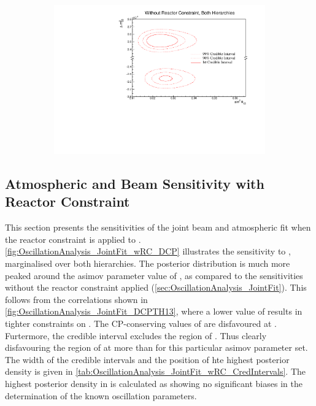 \begin{figure}[h]
  \begin{subfigure}[t]{1.0\textwidth}
    \includegraphics[width=\textwidth, trim={0mm 0mm 0mm 0mm}, clip,page=1]{Figures/OA/JointFit/Contours_2D_th13_dm32_BH_0_woRC_UnSmeared_CredibleInterval.pdf}
  \end{subfigure}
  \caption{}
  \label{fig:OscillationAnalysis_JointFit_DM32TH13}
\end{figure}

\subsection{Atmospheric and Beam Sensitivity with Reactor Constraint}
\label{sec:OscillationAnalysis_JointFit_wRC}

This section presents the sensitivities of the joint beam and atmospheric fit when the reactor constraint is applied to \sinsqreac. \autoref{fig:OscillationAnalysis_JointFit_wRC_DCP} illustrates the sensitivity to , marginalised over both hierarchies. The posterior distribution is much more peaked around the asimov parameter value of , as compared to the sensitivities without the reactor constraint applied (\autoref{sec:OscillationAnalysis_JointFit}). This follows from the correlations shown in \autoref{fig:OscillationAnalysis_JointFit_DCPTH13}, where a lower value of \sinsqreac results in tighter constraints on . The CP-conserving values of  are disfavoured at \quickmath{2\sigma}. Furtermore, the \quickmath{3\sigma} credible interval excludes the region of . Thus clearly disfavouring the region of  at more than \quickmath{3\sigma} for this particular asimov parameter set. The width of the \quickmath{1\sigma} credible intervals and the position of hte highest posterior density is given in \autoref{tab:OscillationAnalysis_JointFit_wRC_CredIntervals}. The highest posterior density in \dcp is calculated as  showing no significant biases in the determination of the known oscillation parameters.
  
